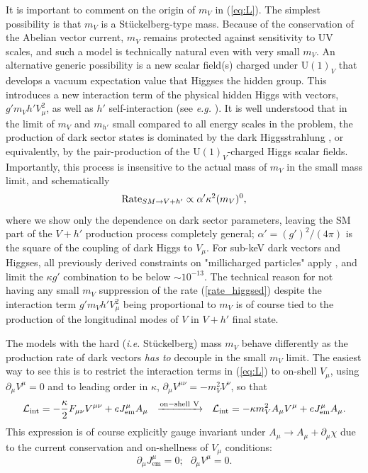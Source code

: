 \documentclass[12pt]{article}
\newcommand{\Uoneprime}{\ensuremath {\mathrm U}(1)_{V}}
\begin{document}
It is important to comment on the origin of $m_V$ in (\ref{eq:L}). The
simplest possibility is that $m_V$ is a St\"uckelberg-type
mass. Because of the conservation of the Abelian vector current, $m_V$
remains protected against sensitivity to UV scales, and such a model is
technically natural even with very small $m_V$. An alternative
generic possibility is a new scalar field(s) charged under $\Uoneprime
$ that develops a vacuum expectation value that Higgses the hidden
group. This introduces a new interaction term of the physical hidden
Higgs with vectors, $g' m_V h' V_{\mu}^2$, as well as $h'$
self-interaction (see {\em e.g.} \cite{Batell:2009yf}). It is 
well understood that in the limit of $m_V$ and $m_{h'}$ small compared to all energy scales in the problem, the production of dark
sector states is dominated by the dark Higgsstrahlung
\cite{Pospelov:2008jk,Batell:2009yf}, or equivalently, by the
pair-production of the $\Uoneprime $-charged Higgs scalar
fields. Importantly, this process is insensitive to the actual mass of
$m_V$ in the small mass limit, and schematically
\begin{equation}
\label{rate_higgsed}
{\rm Rate}_{SM \to V+h'} \propto  \alpha' \kappa^2 (m_V)^0,
\end{equation}
where we show only the dependence on dark sector parameters, leaving the
SM part of the $V+h'$ production process completely general; $\alpha'
= (g')^2/(4 \pi)$ is the square of the coupling of dark Higgs to
$V_\mu$.  For sub-keV dark vectors and Higgses, all previously derived
constraints on "millicharged particles" apply \cite{Davidson:2000hf},
and limit the $\kappa g'$ combination to be below $\sim 10^{-13}$.  The
technical reason for not having any small $m_V$ suppression of the
rate (\ref{rate_higgsed}) despite the interaction term $g' m_V h'
V_{\mu}^2$ being proportional to $m_V$ is of course tied to the
production of the longitudinal modes of $V$ in $V+h'$ final state.

The models with the hard ({\em i.e.} St\"uckelberg) mass $m_V$ behave differently 
as the production rate of dark vectors {\em has to} decouple in the small $m_V$ limit. 
The easiest way to see this is to restrict the interaction terms in (\ref{eq:L}) to on-shell 
$V_\mu$, using $ \partial_\mu V^\mu = 0 $ and to leading order in $\kappa$, $\partial_{\mu} V^{\mu\nu}  = -m_V^2 V^\nu$, so that
\begin{equation}
{\cal L}_{\rm int} = -
  \frac{\kappa}{2} F_{\mu\nu}V^{\mu\nu} 
  + e J_{\mathrm{em}}^{\mu} A_{\mu}  ~~ \xrightarrow{\rm on-shell~V} ~~  
{\cal L}_{\rm int} = - \kappa m_V^2 A_\mu V^\mu
  + e J_{\mathrm{em}}^{\mu} A_{\mu}.
\label{reduction}
\end{equation}
This expression is of course explicitly gauge invariant under $A_\mu \to A_\mu + \partial_\mu \chi$
due to the current conservation and on-shellness of $V_\mu$ conditions:
\begin{equation}
\partial_\mu J_{\mathrm{em}}^{\mu} =0;~~~ \partial_\mu V^\mu = 0.
\end{equation}
\end{document}
